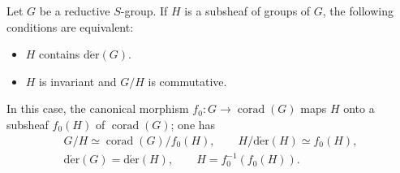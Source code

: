 \label{XXII.6.3.1}
Let $G$ be a reductive $S$-group. If $H$ is a subsheaf of groups of $G$, the following conditions are equivalent:
\begin{itemize}
\item $H$ contains $\operatorname{d\acute er}(G)$.
\item $H$ is invariant and $G/H$ is commutative.
\end{itemize}
In this case, the canonical morphism $f_0:G\to\operatorname{corad}(G)$ maps $H$ onto a subsheaf $f_0(H)$ of $\operatorname{corad}(G)$; one has
\[
\begin{gathered}
G/H\simeq\operatorname{corad}(G)/f_0(H),\qquad H/\operatorname{d\acute er}(H)\simeq f_0(H),\\
\operatorname{d\acute er}(G)=\operatorname{d\acute er}(H),\qquad H=f_0^{-1}(f_0(H)).
\end{gathered}
\]
